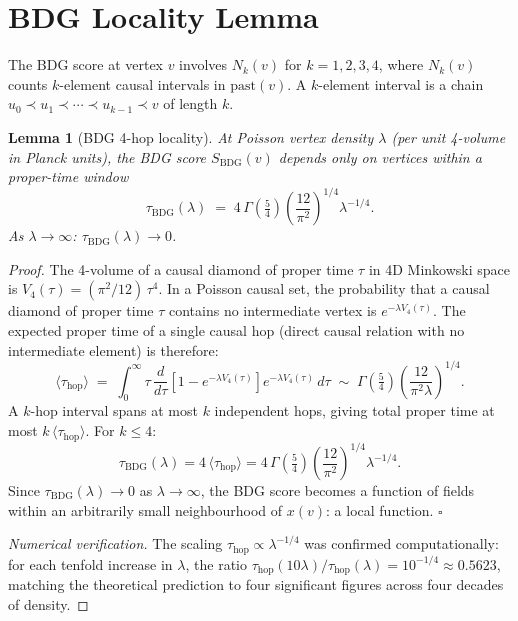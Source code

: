 \documentclass[11pt,a4paper]{article}
\newtheorem{lemma}[theorem]{Lemma}
\newcommand{\SBDG}{S_{\mathrm{BDG}}}
\begin{document}
\section{BDG Locality Lemma}
\label{sec:locality}

The BDG score at vertex $v$ involves $N_k(v)$ for $k = 1,2,3,4$,
where $N_k(v)$ counts $k$-element causal intervals in
$\mathrm{past}(v)$. A $k$-element interval is a chain
$u_0 \prec u_1 \prec \cdots \prec u_{k-1} \prec v$ of length $k$.

\begin{lemma}[BDG 4-hop locality]
\label{lem:locality}
At Poisson vertex density $\lambda$ (per unit 4-volume in Planck
units), the BDG score $\SBDG(v)$ depends only on vertices within a
proper-time window
\begin{equation}
  \tau_{\mathrm{BDG}}(\lambda)
  \;=\; 4\,\Gamma\!\left(\tfrac{5}{4}\right)
        \left(\frac{12}{\pi^2}\right)^{\!1/4}
        \lambda^{-1/4}.
  \label{eq:tau_BDG}
\end{equation}
As $\lambda \to \infty$: $\tau_{\mathrm{BDG}}(\lambda) \to 0$.
\end{lemma}

\begin{proof}
The 4-volume of a causal diamond of proper time $\tau$ in 4D
Minkowski space is $V_4(\tau) = (\pi^2/12)\,\tau^4$. In a Poisson
causal set, the probability that a causal diamond of proper time $\tau$
contains no intermediate vertex is $e^{-\lambda V_4(\tau)}$. The
expected proper time of a single causal hop (direct causal relation
with no intermediate element) is therefore:
\begin{equation}
  \langle\tau_{\mathrm{hop}}\rangle
  \;=\; \int_0^\infty \tau\,
        \frac{d}{d\tau}\!\left[1 - e^{-\lambda V_4(\tau)}\right]
        e^{-\lambda V_4(\tau)}\, d\tau
  \;\sim\; \Gamma\!\left(\tfrac{5}{4}\right)
           \left(\frac{12}{\pi^2\lambda}\right)^{\!1/4}.
\end{equation}
A $k$-hop interval spans at most $k$ independent hops, giving total
proper time at most $k\,\langle\tau_{\mathrm{hop}}\rangle$. For
$k \leq 4$:
\begin{equation}
  \tau_{\mathrm{BDG}}(\lambda)
  = 4\,\langle\tau_{\mathrm{hop}}\rangle
  = 4\,\Gamma\!\left(\tfrac{5}{4}\right)
    \left(\frac{12}{\pi^2}\right)^{\!1/4}
    \lambda^{-1/4}.
\end{equation}
Since $\tau_{\mathrm{BDG}}(\lambda) \to 0$ as $\lambda \to \infty$,
the BDG score becomes a function of fields within an arbitrarily small
neighbourhood of $x(v)$: a local function. \hfill$\square$

\medskip\noindent
\emph{Numerical verification.} The scaling $\tau_{\mathrm{hop}} \propto
\lambda^{-1/4}$ was confirmed computationally: for each tenfold
increase in $\lambda$, the ratio $\tau_{\mathrm{hop}}(10\lambda) /
\tau_{\mathrm{hop}}(\lambda) = 10^{-1/4} \approx 0.5623$, matching
the theoretical prediction to four significant figures across four
decades of density.
\end{proof}
\end{document}
